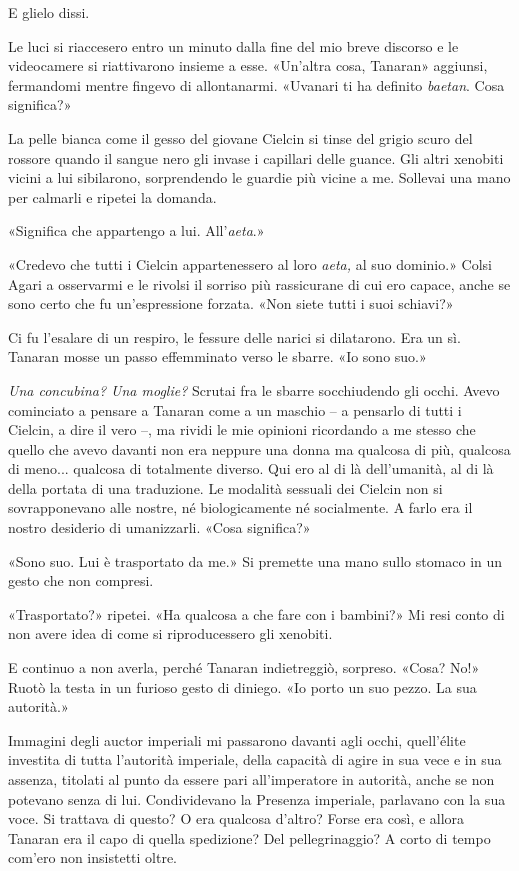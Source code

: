 E glielo dissi.

Le luci si riaccesero entro un minuto dalla fine del mio breve discorso
e le videocamere si riattivarono insieme a esse. «Un'altra cosa,
Tanaran» aggiunsi, fermandomi mentre fingevo di allontanarmi. «Uvanari
ti ha definito \emph{baetan}. Cosa significa?»

La pelle bianca come il gesso del giovane Cielcin si tinse del grigio
scuro del rossore quando il sangue nero gli invase i capillari delle
guance. Gli altri xenobiti vicini a lui sibilarono, sorprendendo le
guardie più vicine a me. Sollevai una mano per calmarli e ripetei la
domanda.

«Significa che appartengo a lui. All'\emph{aeta}.»

«Credevo che tutti i Cielcin appartenessero al loro \emph{aeta,} al suo
dominio.» Colsi Agari a osservarmi e \emph{} le rivolsi il sorriso più
rassicurane di cui ero capace, anche se sono certo che fu un'espressione
forzata. «Non siete tutti i suoi schiavi?»

Ci fu l'esalare di un respiro, le fessure delle narici si dilatarono.
Era un sì. Tanaran mosse un passo effemminato verso le sbarre. «Io sono
suo.»

\emph{Una concubina? Una moglie?} Scrutai fra le sbarre socchiudendo gli
occhi. Avevo cominciato a pensare a Tanaran come a un maschio -- a
pensarlo di tutti i Cielcin, a dire il vero --, ma rividi le mie
opinioni ricordando a me stesso che quello che avevo davanti non era
neppure una donna ma qualcosa di più, qualcosa di meno... qualcosa di
totalmente diverso. Qui ero al di là dell'umanità, al di là della
portata di una traduzione. Le modalità sessuali dei Cielcin non si
sovrapponevano alle nostre, né biologicamente né socialmente. A farlo
era il nostro desiderio di umanizzarli. «Cosa significa?»

«Sono suo. Lui è trasportato da me.» Si premette una mano sullo stomaco
in un gesto che non compresi.

«Trasportato?» ripetei. «Ha qualcosa a che fare con i bambini?» Mi resi
conto di non avere idea di come si riproducessero gli xenobiti.

E continuo a non averla, perché Tanaran indietreggiò, sorpreso. «Cosa?
No!» Ruotò la testa in un furioso gesto di diniego. «Io porto un suo
pezzo. La sua autorità.»

Immagini degli auctor \emph{} imperiali mi passarono davanti agli occhi,
quell'élite investita di tutta l'autorità imperiale, della capacità di
agire in sua vece e in sua assenza, titolati al punto da essere pari
all'imperatore in autorità, anche se non potevano senza di lui.
Condividevano la Presenza imperiale, parlavano con la sua voce. Si
trattava di questo? O era qualcosa d'altro? Forse era così, e allora
Tanaran era il capo di quella spedizione? Del pellegrinaggio? A corto di
tempo com'ero non insistetti oltre.

